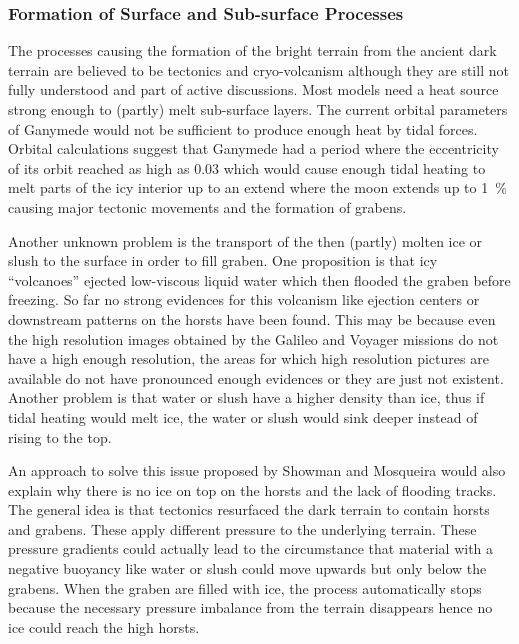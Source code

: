\subsubsection{Formation of Surface and Sub-surface Processes\label{sub:volcanism}}
%
The processes causing the formation of the bright terrain from the
ancient dark terrain are believed to be tectonics and cryo-volcanism
although they are still not fully understood and part of active discussions\cite{Patterson2010,Schenk2001,Showman2004}.
Most models need a heat source strong enough to (partly) melt sub-surface
layers. The current orbital parameters of Ganymede would not be sufficient
to produce enough heat by tidal forces. Orbital calculations suggest
that Ganymede had a period where the eccentricity of its orbit reached
as high as 0.03\cite{Showman1997} which would cause enough tidal
heating to melt parts of the icy interior up to an extend where the
moon extends up to 1~\% causing major tectonic movements and the
formation of grabens\cite{Showman2004}. 

Another unknown problem is the transport of the then (partly) molten
ice or slush to the surface in order to fill graben. One proposition
is that icy ``volcanoes'' ejected low-viscous liquid water which
then flooded the graben before freezing. So far no strong evidences
for this volcanism like ejection centers or downstream patterns on
the horsts have been found\cite{Patterson2010}. This may be because
even the high resolution images obtained by the Galileo and Voyager
missions do not have a high enough resolution, the areas for which
high resolution pictures are available do not have pronounced enough
evidences or they are just not existent\cite{Patterson2010,Schenk2001,Showman2004}.
Another problem is that water or slush have a higher density than
ice, thus if tidal heating would melt ice, the water or slush would
sink deeper instead of rising to the top.

An approach to solve this issue proposed by Showman and Mosqueira
would also explain why there is no ice on top on the horsts and the
lack of flooding tracks. The general idea is that tectonics resurfaced
the dark terrain to contain horsts and grabens. These apply different
pressure to the underlying terrain. These pressure gradients could
actually lead to the circumstance that material with a negative buoyancy
like water or slush could move upwards but only below the grabens.
When the graben are filled with ice, the process automatically stops
because the necessary pressure imbalance from the terrain disappears
hence no ice could reach the high horsts\cite{Showman2004}. 

